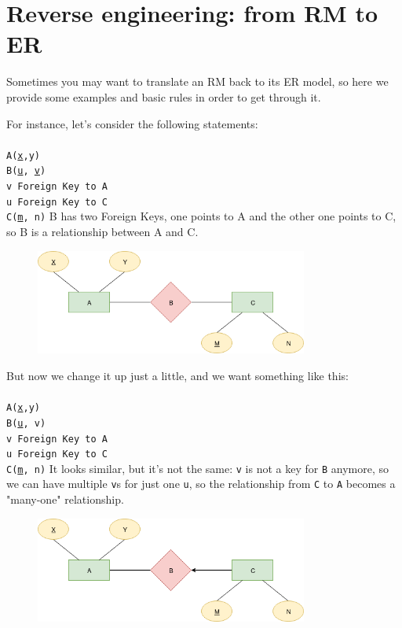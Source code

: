 \documentclass[class=book, crop=false, oneside]{standalone}
\newcommand\tab[1][1cm]{\hspace*{#1}}
\begin{document}
\chapter{Reverse engineering: from RM to ER}
Sometimes you may want to translate an RM back to its ER model, so here we provide some examples and basic rules in order to get through it.

For instance, let's consider the following statements:\\\\
\texttt{A(\underline{x},y)}\\
\texttt{B(\underline{u}, \underline{v})}\\
\tab[.4cm] \texttt{v Foreign Key to A}\\
\tab[.4cm] \texttt{u Foreign Key to C}\\
\texttt{C(\underline{m}, n)}
\vskip 5pt
B has two Foreign Keys, one points to A and the other one points to C, so B is a relationship between A and C.
\begin{figure}[H]
	\includegraphics[width=0.8\textwidth,keepaspectratio]{diagram3_00.png}
	\caption{}
	\label{diagram3_00}
\end{figure}
\vskip 5pt
But now we change it up just a little, and we want something like this:\\\\
\texttt{A(\underline{x},y)}\\
\texttt{B(\underline{u}, v)}\\
\tab[.4cm] \texttt{v Foreign Key to A}\\
\tab[.4cm] \texttt{u Foreign Key to C}\\
\texttt{C(\underline{m}, n)}
\vskip 5pt
It looks similar, but it's not the same: \texttt{v} is not a key for \texttt{B} anymore, so we can have multiple \texttt{v}s for just one \texttt{u}, so the relationship from \texttt{C} to \texttt{A} becomes a "many-one" relationship.
\begin{figure}[H]
	\includegraphics[width=0.8\textwidth,keepaspectratio]{diagram3_01.png}
	\caption{}
	\label{diagram3_01}
\end{figure}
\end{document}

